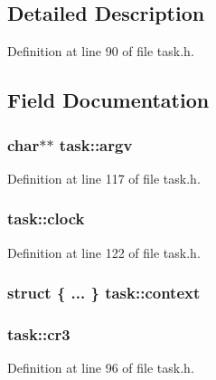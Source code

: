 \subsection{Detailed Description}


Definition at line 90 of file task.\+h.



\subsection{Field Documentation}
\hypertarget{structtask_a91e7540d20695c7439f7d0755a7a0545}{
\subsubsection[{argv}]{\setlength{\rightskip}{0pt plus 5cm}char$\ast$$\ast$ task\+::argv}}\label{structtask_a91e7540d20695c7439f7d0755a7a0545}


Definition at line 117 of file task.\+h.

\hypertarget{structtask_a8a31c6648c1b1869bfa069f4a969b0ad}{
\subsubsection[{clock}]{ task\+::clock}}\label{structtask_a8a31c6648c1b1869bfa069f4a969b0ad}


Definition at line 122 of file task.\+h.

\hypertarget{structtask_a7e47fc3627188eeefc77f78e8d36ddd1}{
\subsubsection[{context}]{\setlength{\rightskip}{0pt plus 5cm}struct \{ ... \}   task\+::context}}\label{structtask_a7e47fc3627188eeefc77f78e8d36ddd1}
\hypertarget{structtask_a5f4968459d4640f19c7e802ae7057179}{
\subsubsection[{cr3}]{ task\+::cr3}}\label{structtask_a5f4968459d4640f19c7e802ae7057179}


Definition at line 96 of file task.\+h.

